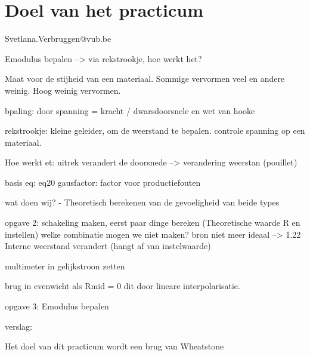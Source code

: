 \section{Doel van het practicum}

Svetlana.Verbruggen@vub.be

Emodulus bepalen
--> via rekstrookje, hoe werkt het?

Maat voor de stijheid van een materiaal. Sommige vervormen veel en andere weinig. Hoog weinig vervormen.

bpaling: door spanning = kracht / dwarsdoorsnele en wet van hooke

rekstrookje: kleine geleider, om de weerstand te bepalen. controle spanning op een materiaal.

Hoe werkt et: uitrek verandert de doorsnede --> verandering weerstan (pouillet)

basis eq: eq20
gausfactor: factor voor productiefouten

wat doen wij?
- Theoretisch berekenen van de gevoeligheid van beide types

opgave 2: schakeling maken, eerst paar dinge bereken (Theoretische waarde R en instellen)
welke combinatie mogen we niet maken?
bron niet meer ideaal --> 1.22
Interne weerstand verandert (hangt af van instelwaarde)

multimeter in gelijkstroon zetten

brug in evenwicht als Rmid = 0
dit door lineare interpolarisatie.

opgave 3: Emodulus bepalen

verslag:

Het doel van dit practicum wordt een brug van Wheatstone